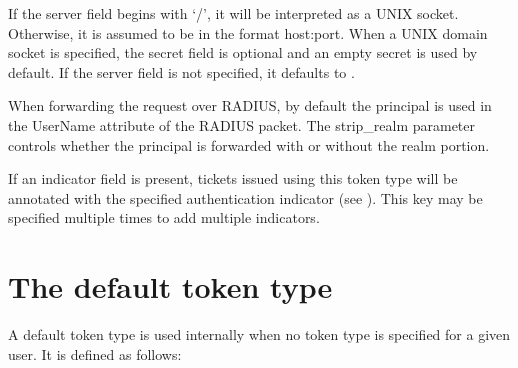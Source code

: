 \documentclass[letterpaper,10pt,english]{sphinxmanual}
\begin{document}
\begin{sphinxVerbatim}[commandchars=\\\{\}]
\PYG{p}{[}\PYG{p}{]}
      
               
          
             \PYG{p}{[}\PYG{p}{]}
            
            
            
\end{sphinxVerbatim}

\sphinxAtStartPar
If the server field begins with ‘/’, it will be interpreted as a UNIX
socket.  Otherwise, it is assumed to be in the format host:port.  When
a UNIX domain socket is specified, the secret field is optional and an
empty secret is used by default.  If the server field is not
specified, it defaults to {\hyperref[\detokenize{mitK5defaults:paths}]{}}.

\sphinxAtStartPar
When forwarding the request over RADIUS, by default the principal is
used in the User\sphinxhyphen{}Name attribute of the RADIUS packet.  The strip\_realm
parameter controls whether the principal is forwarded with or without
the realm portion.

\sphinxAtStartPar
If an indicator field is present, tickets issued using this token type
will be annotated with the specified authentication indicator (see
{\hyperref[\detokenize{admin/auth_indicator:auth-indicator}]{}}).  This key may be specified multiple times to
add multiple indicators.


\section{The default token type}
\label{\detokenize{admin/otp:the-default-token-type}}
\sphinxAtStartPar
A default token type is used internally when no token type is specified for a
given user.  It is defined as follows:
\end{document}

